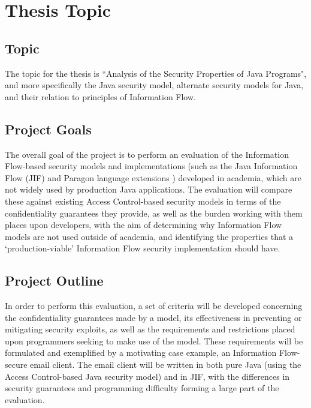 \section{Thesis Topic}

\subsection{Topic}

The topic for the thesis is ``Analysis of the Security Properties of Java Programs", and more specifically the Java security model, alternate security models for Java, and their relation to principles of Information Flow. 

\subsection{Project Goals}

The overall goal of the project is to perform an evaluation of the Information Flow-based security models and implementations (such as the Java Information Flow (JIF) and Paragon language extensions \cite{pullicino2014jif}\cite{broberg2013paragon}) developed in academia, which are not widely used by production Java applications. The evaluation will compare these against existing Access Control-based security models in terms of the confidentiality guarantees they provide, as well as the burden working with them places upon developers, with the aim of determining why Information Flow models are not used outside of academia, and identifying the properties that a `production-viable' Information Flow security implementation should have.

\subsection{Project Outline}

In order to perform this evaluation, a set of criteria will be developed concerning the confidentiality guarantees made by a model, its effectiveness in preventing or mitigating security exploits, as well as the requirements and restrictions placed upon programmers seeking to make use of the model. These requirements will be formulated and exemplified by a motivating case example, an Information Flow-secure email client. The email client will be written in both pure Java (using the Access Control-based Java security model) and in JIF, with the differences in security guarantees and programming difficulty forming a large part of the evaluation.

